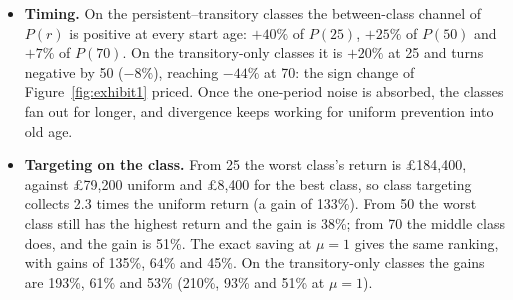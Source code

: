\documentclass[11pt]{article}
\begin{document}
\begin{itemize}
		\item \textbf{Timing.} On the persistent--transitory classes the between-class channel of $P(r)$ is positive at every start age: $+40\%$ of $P(25)$, $+25\%$ of $P(50)$ and $+7\%$ of $P(70)$. On the transitory-only classes it is $+20\%$ at 25 and turns negative by 50 ($-8\%$), reaching $-44\%$ at 70: the sign change of Figure~\ref{fig:exhibit1} priced. Once the one-period noise is absorbed, the classes fan out for longer, and divergence keeps working for uniform prevention into old age.
		\item \textbf{Targeting on the class.} From 25 the worst class's return is \pounds184{,}400, against \pounds79{,}200 uniform and \pounds8{,}400 for the best class, so class targeting collects 2.3 times the uniform return (a gain of 133\%). From 50 the worst class still has the highest return and the gain is 38\%; from 70 the middle class does, and the gain is 51\%. The exact saving at $\mu=1$ gives the same ranking, with gains of 135\%, 64\% and 45\%. On the transitory-only classes the gains are 193\%, 61\% and 53\% (210\%, 93\% and 51\% at $\mu=1$).
	\end{itemize}
	
\end{document}
